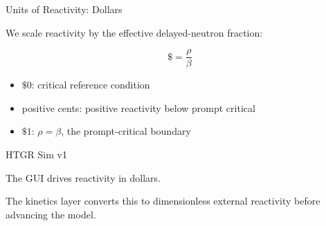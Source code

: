 \documentclass[aspectratio=169]{beamer}
\begin{document}
\begin{frame}{Units of Reactivity: Dollars}

    We scale reactivity by the effective delayed-neutron fraction:

    \[
        \$
        =
        \frac{\rho}{\beta}
    \]

    \vspace{1em}

    \begin{itemize}

        \item $\$0$:
              critical reference condition

        \item positive cents:
              positive reactivity below prompt critical

        \item $\$1$:
              $\rho = \beta$, the prompt-critical boundary

    \end{itemize}

    \begin{block}{HTGR Sim v1}

        The GUI drives reactivity in dollars.

        The kinetics layer converts this to dimensionless external reactivity
        before advancing the model.

    \end{block}

\end{frame}


\end{document}
